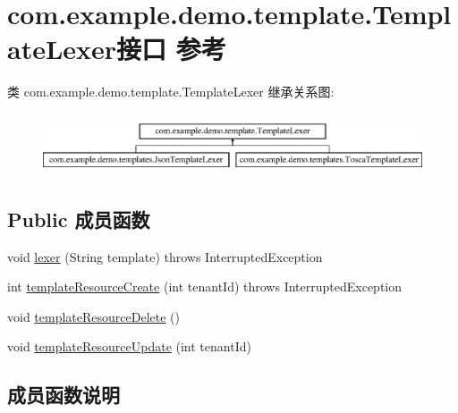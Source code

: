 \hypertarget{interfacecom_1_1example_1_1demo_1_1template_1_1_template_lexer}{}\section{com.\+example.\+demo.\+template.\+Template\+Lexer接口 参考}
\label{interfacecom_1_1example_1_1demo_1_1template_1_1_template_lexer}
类 com.\+example.\+demo.\+template.\+Template\+Lexer 继承关系图\+:\begin{figure}[H]
\begin{center}
\leavevmode
\includegraphics[height=1.848185cm]{interfacecom_1_1example_1_1demo_1_1template_1_1_template_lexer}
\end{center}
\end{figure}
\subsection*{Public 成员函数}
\begin{DoxyCompactItemize}
\item 
void \mbox{\hyperlink{interfacecom_1_1example_1_1demo_1_1template_1_1_template_lexer_af43b628c7563000d156b02cc76c1abce}{lexer}} (String template)  throws Interrupted\+Exception
\item 
int \mbox{\hyperlink{interfacecom_1_1example_1_1demo_1_1template_1_1_template_lexer_a652b7317dde4c2b055f682dec4092703}{template\+Resource\+Create}} (int tenant\+Id)  throws Interrupted\+Exception
\item 
void \mbox{\hyperlink{interfacecom_1_1example_1_1demo_1_1template_1_1_template_lexer_a7617e70e95636b863a50f1a72d81e28f}{template\+Resource\+Delete}} ()
\item 
void \mbox{\hyperlink{interfacecom_1_1example_1_1demo_1_1template_1_1_template_lexer_a83b30db96a9095fe1fa5d9a9040c0ceb}{template\+Resource\+Update}} (int tenant\+Id)
\end{DoxyCompactItemize}


\subsection{成员函数说明}
\mbox{\label{interfacecom_1_1example_1_1demo_1_1template_1_1_template_lexer_af43b628c7563000d156b02cc76c1abce}} 
